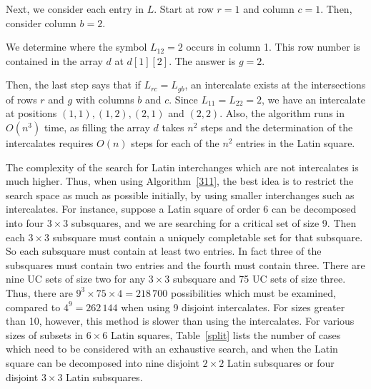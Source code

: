 \documentclass[12pt]{report}
\begin{document}
Next, we consider each entry in $L$.  Start at row $r = 1$ and column $c = 1$.
Then, consider column $b = 2$.

We determine where the symbol $L_{12} = 2$ occurs in column 1.  This
row number is contained in the array $d$ at $d[1][2]$.  The answer is $g = 2$.

Then, the last step says that if $L_{rc} = L_{gb}$, an intercalate
exists at the intersections of rows $r$ and $g$ with columns $b$ and $c$.
Since $L_{11} = L_{22} = 2$, we have an intercalate at positions $(1,1),
(1,2), (2,1)$ and $(2,2)$.  Also, the algorithm runs in $O(n^3)$ time, as filling the
array $d$ takes $n^2$ steps and the determination of the intercalates
requires $O(n)$ steps for each of the $n^2$ entries in the Latin square.

The complexity of the search for Latin interchanges which are
not intercalates is much higher.  Thus, when using Algorithm~\ref{311},
the best idea is to restrict the search space
as much as possible initially, by using smaller interchanges such
as intercalates.  For instance, suppose a Latin square
of order 6 can be decomposed into four $3 \times 3$ subsquares, and
we are searching for a critical set of size 9.  Then each $3 \times 3$
subsquare must contain a uniquely completable set for that subsquare.
So each subsquare must contain at least two entries.  In fact three of
the subsquares must contain two entries and the fourth must contain three.
There are nine UC sets of size two for any $3 \times 3$ subsquare and 75
UC sets of size three.  Thus, there are $9^3 \times 75 \times 4 = 218\,700$
possibilities which must be examined, compared to ${4^9 = 262\,144}$ when
using 9 disjoint intercalates.  For sizes greater than 10, however,
this method is slower than using the intercalates.  For various sizes
of subsets in $6 \times 6$ Latin squares, Table~\ref{split} lists
the number of cases which need to be considered with an exhaustive search,
and when the Latin square can be decomposed into nine disjoint $2 \times 2$ Latin 
subsquares or four disjoint $3 \times 3$ Latin subsquares.
\end{document}

